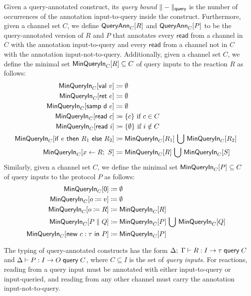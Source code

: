 Given a query-annotated \ipdl construct, its \emph{query bound} $\qnorm{-}$ is the number of occurrences of the annotation \textsf{input-to-query} inside the construct. Furthermore, given a channel set $C$, we define $\QAnn{R}{C}$ and $\QAnn{P}{C}$ to be the query-annotated version of $R$ and $P$ that annotates every $\mathsf{read}$ from a channel in $C$ with the annotation \textsf{input-to-query} and every $\mathsf{read}$ from a channel not in $C$ with the annotation \textsf{input-not-to-query}. Additionally, given a channel set $C$, we define the minimal set $\MinQIn{R}{C} \subseteq C$ of query inputs to the reaction $R$ as follows:
\begin{align*}
\MinQIn{\val{v}}{C} & \coloneqq \emptyset \\
\MinQIn{\ret{e}}{C} & \coloneqq \emptyset \\
\MinQIn{\samp{\dist}{e}}{C} & \coloneqq \emptyset \\
\MinQIn{\read{c}}{C} & \coloneqq \{c\} \text{ if } c \in C \\
\MinQIn{\read{i}}{C} & \coloneqq \{\emptyset\} \text{ if } i \notin C \\
\MinQIn{\ifte{e}{R_1}{R_2}}{C} & \coloneqq \MinQIn{R_1}{C} \, \bigcup \, \MinQIn{R_2}{C} \\
\MinQIn{x \leftarrow R; \ S}{C} & \coloneqq \MinQIn{R}{C} \, \bigcup \, \MinQIn{S}{C}
\end{align*}
Similarly, given a channel set $C$, we define the minimal set $\MinQIn{P}{C} \subseteq C$ of query inputs to the protocol $P$ as follows:
\begin{align*}
\MinQIn{\zero}{C} & \coloneqq \emptyset \\
\MinQIn{\assign{o}{v}}{C} & \coloneqq \emptyset \\
\MinQIn{\assign{o}{R}}{C} & \coloneqq \MinQIn{R}{C} \\
\MinQIn{\Par{P}{Q}}{C} & \coloneqq \MinQIn{P}{C} \, \bigcup \, \MinQIn{Q}{C} \\
\MinQIn{\new{c}{\tau}{P}}{C} & \coloneqq \MinQIn{P}{C}
\end{align*}

\noindent The typing of query-annotated \ipdl constructs has the form $\Delta; \ \Gamma \vdash R : I \to \tau \query C$ and $\Delta \vdash P : I \to O \query C$, where $C \subseteq I$ is the set of \emph{query inputs}. For reactions, reading from a query input must be annotated with either \textsf{input-to-query} or \textsf{input-queried}, and reading from any other channel must carry the annotation \textsf{input-not-to-query}.


